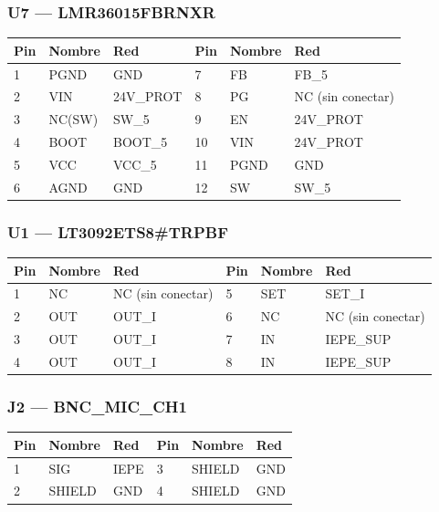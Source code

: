 \documentclass[10pt,a4paper]{article}
\begin{document}
\subsubsection*{U7 — LMR36015FBRNXR}
{\footnotesize\begin{tabular}{@{}lll|lll@{}}\toprule
\textbf{Pin} & \textbf{Nombre} & \textbf{Red} & \textbf{Pin} & \textbf{Nombre} & \textbf{Red}\\\midrule
1 & PGND & GND & 7 & FB & FB\_\allowbreak{}5\\
2 & VIN & 24V\_\allowbreak{}PROT & 8 & PG & NC (sin conectar)\\
3 & NC(SW) & SW\_\allowbreak{}5 & 9 & EN & 24V\_\allowbreak{}PROT\\
4 & BOOT & BOOT\_\allowbreak{}5 & 10 & VIN & 24V\_\allowbreak{}PROT\\
5 & VCC & VCC\_\allowbreak{}5 & 11 & PGND & GND\\
6 & AGND & GND & 12 & SW & SW\_\allowbreak{}5\\
\bottomrule\end{tabular}}
\subsubsection*{U1 — LT3092ETS8\#TRPBF}
{\footnotesize\begin{tabular}{@{}lll|lll@{}}\toprule
\textbf{Pin} & \textbf{Nombre} & \textbf{Red} & \textbf{Pin} & \textbf{Nombre} & \textbf{Red}\\\midrule
1 & NC & NC (sin conectar) & 5 & SET & SET\_\allowbreak{}I\\
2 & OUT & OUT\_\allowbreak{}I & 6 & NC & NC (sin conectar)\\
3 & OUT & OUT\_\allowbreak{}I & 7 & IN & IEPE\_\allowbreak{}SUP\\
4 & OUT & OUT\_\allowbreak{}I & 8 & IN & IEPE\_\allowbreak{}SUP\\
\bottomrule\end{tabular}}
\subsubsection*{J2 — BNC\_\allowbreak{}MIC\_\allowbreak{}CH1}
{\footnotesize\begin{tabular}{@{}lll|lll@{}}\toprule
\textbf{Pin} & \textbf{Nombre} & \textbf{Red} & \textbf{Pin} & \textbf{Nombre} & \textbf{Red}\\\midrule
1 & SIG & IEPE & 3 & SHIELD & GND\\
2 & SHIELD & GND & 4 & SHIELD & GND\\
\bottomrule\end{tabular}}
\end{document}
